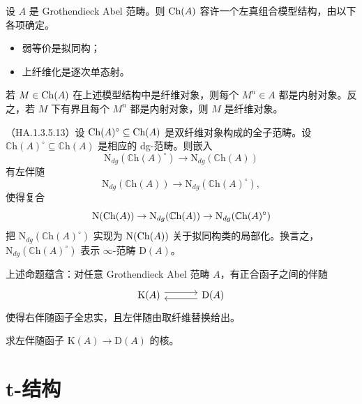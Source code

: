 \begin{theorem}\label{L17-2.23}
设 $A$ 是 Grothendieck Abel 范畴。则 $\operatorname{Ch}(A)$ 容许一个左真组合模型结构，由以下各项确定。
\begin{itemize}[leftmargin=3.4em,itemsep=0.1em]
\item[(W)] 弱等价是拟同构；
\item[(C)] 上纤维化是逐次单态射。
\end{itemize}
\end{theorem}

\begin{exercise}\label{L17-2.24}
若 $M\in\operatorname{Ch}(A)$ 在上述模型结构中是纤维对象，则每个 $M^n\in A$ 都是内射对象。反之，若 $M$ 下有界且每个 $M^n$ 都是内射对象，则 $M$ 是纤维对象。
\end{exercise}

\begin{proposition}\label{L17-2.25}
（HA.1.3.5.13）设 $\operatorname{Ch}(A)^{\circ}\subseteq\operatorname{Ch}(A)$ 是双纤维对象构成的全子范畴。设 $\mathbb{C}\mathrm{h}(A)^{\circ}\subseteq\mathbb{C}\mathrm{h}(A)$ 是相应的 dg-范畴。则嵌入
\[
\mathrm{N}_{dg}(\mathbb{C}\mathrm{h}(A)^{\circ})\to\mathrm{N}_{dg}(\mathbb{C}\mathrm{h}(A))
\]
有左伴随
\[
\mathrm{N}_{dg}(\mathbb{C}\mathrm{h}(A))\to\mathrm{N}_{dg}(\mathbb{C}\mathrm{h}(A)^{\circ}),
\]
使得复合
\[
\mathrm{N}(\operatorname{Ch}(A))\to\mathrm{N}_{dg}(\mathbb{C}\mathrm{h}(A))\to\mathrm{N}_{dg}(\mathbb{C}\mathrm{h}(A)^{\circ})
\]
把 $\mathrm{N}_{dg}(\mathbb{C}\mathrm{h}(A)^{\circ})$ 实现为 $\mathrm{N}(\operatorname{Ch}(A))$ 关于拟同构类的局部化。换言之，$\mathrm{N}_{dg}(\mathbb{C}\mathrm{h}(A)^{\circ})$ 表示 $\infty$-范畴 $\mathrm{D}(A)$。
\end{proposition}

\nitem\label{L17-2.26} 上述命题蕴含：对任意 Grothendieck Abel 范畴 $A$，有正合函子之间的伴随
\begin{equation}\label{L17-eq2.1}
\begin{tikzcd}[column sep=3.4em]
\mathrm{K}(A) \arrow[r, shift left=0.7ex] & \mathrm{D}(A) \arrow[l, shift left=0.7ex]
\end{tikzcd}
\end{equation}
使得右伴随函子全忠实，且左伴随由取纤维替换给出。

\begin{exercise}\label{L17-2.27}
求左伴随函子 $\mathrm{K}(A)\to\mathrm{D}(A)$ 的核。
\end{exercise}

\section{t-结构}

